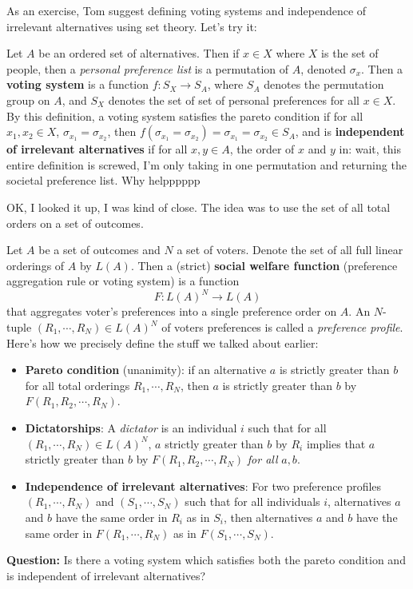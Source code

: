 As an exercise, Tom suggest defining voting systems and independence of irrelevant alternatives using set theory. Let's try it:
\begin{definition}[]
    Let $A$ be an ordered set of alternatives. Then if $x\in X$ where $X$ is the set of people, then a \emph{personal preference list} is a permutation of $A$, denoted $\sigma_x$. Then a \textbf{voting system} is a function $f \colon S_X \to S_A$, where $S_A$ denotes the permutation group on $A$, and $S_X$ denotes the set of set of personal preferences for all $x\in X$. By this definition, a voting system satisfies the pareto condition if for all $x_1,x_2\in X$, $\sigma_{x_1}=\sigma_{x_2}$, then $f(\sigma_{x_1}=\sigma_{x_2})=\sigma_{x_1}=\sigma_{x_2}\in S_A$, and is \textbf{independent of irrelevant alternatives} if for all $x,y\in A$, the order of $x$ and $y$ in: wait, this entire definition is screwed, I'm only taking in one permutation and returning the societal preference list. Why helpppppp
\end{definition}
    OK, I looked it up, I was kind of close. The idea was to use the set of all total orders on a set of outcomes.
\begin{definition}
Let $A$ be a set of outcomes and $N$ a set of voters. Denote the set of all full linear orderings of $A$ by $L(A)$. Then a (strict) \textbf{social welfare function} (preference aggregation rule or voting system) is a function \[
    F \colon L(A)^N \to L(A)
\] that aggregates voter's preferences into a single preference order on $A$. An $N$-tuple $(R_1,\cdots ,R_N)\in L(A)^N$ of voters preferences is called a \emph{preference profile}. Here's how we precisely define the stuff we talked about earlier:
\begin{itemize}
    \item \textbf{Pareto condition} (unanimity): if an alternative $a$ is strictly greater than $b$ for all total orderings $R_1,\cdots ,R_N$, then $a$ is strictly greater than $b$ by $F(R_1,R_2,\cdots , R_N)$.
    \item \textbf{Dictatorships}: A \emph{dictator} is an individual $i$ such that for all $(R_1,\cdots ,R_N)\in L(A)^N$, $a$ strictly greater than $b$ by $R_i $ implies that $a$ strictly greater than $b$ by $F(R_1,R_2,\cdots ,R_N)$ \emph{for all} $a,b$.
    \item \textbf{Independence of irrelevant alternatives}: For two preference profiles $(R_1,\cdots ,R_N)$ and $(S_1,\cdots , S_N)$ such that for all individuals $i$, alternatives $a$ and $b$ have the same order in $R_i $ as in $S_i $, then alternatives $a$ and $b$ have the same order in $F(R_1,\cdots ,R_N)$ as in $F(S_1 ,\cdots ,S_N)$.
\end{itemize}
\end{definition}
\noindent\textbf{Question:} Is there a voting system which satisfies both the pareto condition and is independent of irrelevant alternatives?

